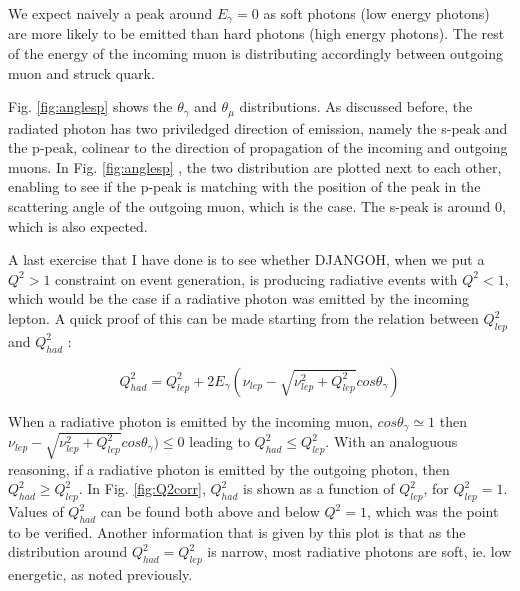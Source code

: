 We expect naively a peak around $E_{\gamma} = 0$ as soft photons (low energy photons)
are more likely to be emitted than hard photons (high energy photons). The rest of
the energy of the incoming muon is distributing accordingly between outgoing muon and
struck quark.

Fig. \ref{fig:anglesp} shows the $\theta_{\gamma}$ and $\theta_{\mu}$
distributions. As discussed before, the radiated photon has two priviledged direction of
emission, namely the s-peak and the p-peak, colinear to the direction of propagation
of the incoming and outgoing muons. In Fig. \ref{fig:anglesp} , the two distribution are plotted next
to each other, enabling to see if the p-peak is matching with the position of the peak in the scattering
angle of the outgoing muon, which is the case. The s-peak is around 0, which is
also expected.

A last exercise that I have done is to see whether DJANGOH, when we put a $Q^2>1$ constraint on event
generation, is producing radiative events with $Q^2<1$, which would be the case if a radiative photon
was emitted by the incoming lepton. A quick proof of this can be made starting from the relation
between $Q^2_{lep}$ and $Q^2_{had}$ :

\[Q^2_{had}=Q^2_{lep}+2E_\gamma(\nu_{lep}-\sqrt{\nu_{lep}^2+Q^2_{lep}}cos\theta_\gamma)\]

When a radiative photon is emitted by the incoming muon, $cos\theta_\gamma \simeq 1$ then
$\nu_{lep}-\sqrt{\nu_{lep}^2+Q^2_{lep}}cos\theta_\gamma) \leq 0$ leading to $Q^2_{had} \leq Q^2_{lep}$.
With an analoguous reasoning, if a radiative photon is emitted by the outgoing photon, then $Q^2_{had} \geq Q^2_{lep}$.
In Fig. \ref{fig:Q2corr}, $Q^2_{had}$ is shown as a function of $Q^2_{lep}$, for $Q^2_{lep}=1$. Values of $Q^2_{had}$ can be found
both above and below $Q^2=1$, which was the point to be verified. Another information that is given by this
plot is that as the distribution around $Q^2_{had} = Q^2_{lep}$ is narrow, most radiative photons are soft, ie. low
energetic, as noted previously.

